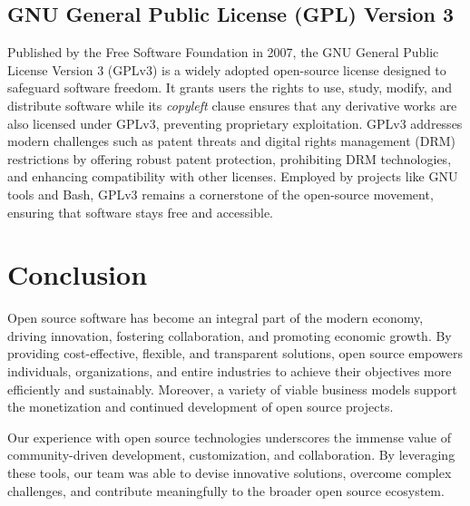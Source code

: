 \subsection{GNU General Public License (GPL) Version 3}

Published by the Free Software Foundation in 2007, the GNU General Public License Version 3 (GPLv3) is a widely adopted open-source license designed to safeguard software freedom. 
It grants users the rights to use, study, modify, and distribute software while its \textit{copyleft} clause ensures that any derivative works are also licensed under GPLv3, 
preventing proprietary exploitation. GPLv3 addresses modern challenges such as patent threats and digital rights management (DRM) restrictions by offering robust patent protection, prohibiting DRM technologies, 
and enhancing compatibility with other licenses. Employed by projects like GNU tools and Bash, GPLv3 remains a cornerstone of the open-source movement, ensuring that software stays free and accessible.

\section{Conclusion}

Open source software has become an integral part of the modern economy, driving innovation, fostering collaboration, 
and promoting economic growth. By providing cost-effective, flexible, and transparent solutions, open source empowers individuals, 
organizations, and entire industries to achieve their objectives more efficiently and sustainably. Moreover, 
a variety of viable business models support the monetization and continued development of open source projects.

Our experience with open source technologies underscores the immense value of community-driven development, customization, 
and collaboration. By leveraging these tools, our team was able to devise innovative solutions, overcome complex challenges, 
and contribute meaningfully to the broader open source ecosystem.


